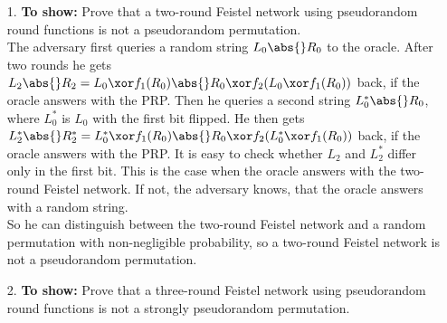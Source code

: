 \begin{itemize}
	\item [1.]
		\textbf{To show:} Prove that a two-round Feistel network using pseudorandom round functions is not a pseudorandom permutation.\\
		The adversary first queries a random string \(L_0 \abs{} R_0\) to the oracle. After two rounds he gets \(L_2 \abs{} R_2 = L_0 \xor f_1(R_0) \abs{} R_0 \xor f_2( L_0 \xor f_1(R_0))\) back, if the oracle answers with the PRP. Then he queries a second string \(L_0^* \abs{} R_0\), where \(L_0^*\) is \(L_0\) with the first bit flipped. 
		He then gets \(L_2^* \abs{} R_2^* = L_0^* \xor f_1(R_0) \abs{} R_0 \xor f_2( L_0^* \xor f_1(R_0))\) back, if the oracle answers with the PRP. It is easy to check whether \(L_2\) and \(L_2^*\) differ only in the first bit. This is the case when the oracle answers with the two-round Feistel network. If not, the adversary knows, that the oracle answers with a random string. \\
		So he can distinguish between the two-round Feistel network and a random permutation with non-negligible probability, so a two-round Feistel network is not a pseudorandom permutation. 
	\item [2.]
		\textbf{To show:} Prove that a three-round Feistel network using pseudorandom round functions is not a strongly pseudorandom permutation.
\end{itemize}